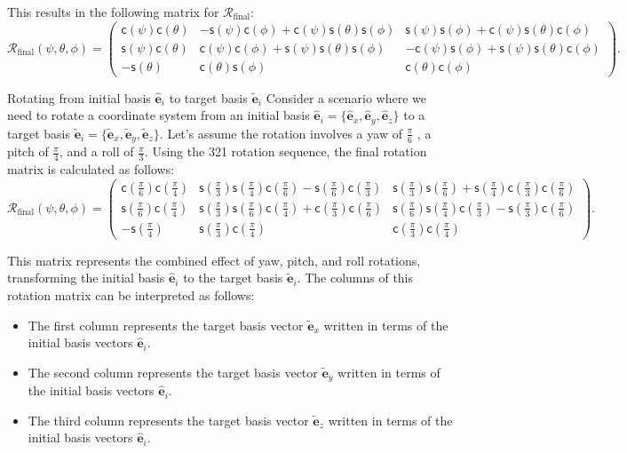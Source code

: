 \documentclass{article}
\def\eh{\hat{\mathbf{e}}}
\def\et{\tilde{\mathbf{e}}}
\def\R{\mathcal{R}}
\def\c{\textsf{c}}
\def\s{\textsf{s}}
\begin{document}
\noindent This results in the following matrix for \(\R_{\text{final}}\):
\[
  \R_{\text{final}} (\psi, \theta, \phi) = 
\begin{pmatrix}
\c(\psi)\c(\theta) & -\s(\psi)\c(\phi) + \c(\psi)\s(\theta)\s(\phi) & \s(\psi)\s(\phi) + \c(\psi)\s(\theta)\c(\phi) \\
\s(\psi)\c(\theta) & \c(\psi)\c(\phi) + \s(\psi)\s(\theta)\s(\phi) & -\c(\psi)\s(\phi) + \s(\psi)\s(\theta)\c(\phi) \\
-\s(\theta) & \c(\theta)\s(\phi) & \c(\theta)\c(\phi)
\end{pmatrix}.
\]

\begin{egsBox}[label={egs:rot3Dex1}, float, floatplacement=t]{Rotating from initial basis $\eh_i$ to target basis $\et_i$}
  \footnotesize
  Consider a scenario where we need to rotate a coordinate system from an initial basis $\eh_i = \{\eh_x, \eh_y, \eh_z\}$ to a target basis $\et_i = \{\et_x, \et_y, \et_z\}$. Let's assume the rotation involves a yaw of $\frac{\pi}{6}$ , a pitch of $\frac{\pi}{4}$, and a roll of $\frac{\pi}{3}$. Using the 321 rotation sequence, the final rotation matrix is calculated as follows:
 \[
  \R_{\text{final}} (\psi, \theta, \phi) = \begin{pmatrix}
\c(\frac{\pi}{6}) \c(\frac{\pi}{4}) & \s(\frac{\pi}{3}) \s(\frac{\pi}{4}) \c(\frac{\pi}{6}) - \s(\frac{\pi}{6}) \c(\frac{\pi}{3}) & \s(\frac{\pi}{3}) \s(\frac{\pi}{6}) + \s(\frac{\pi}{4}) \c(\frac{\pi}{3}) \c(\frac{\pi}{6}) \\
\s(\frac{\pi}{6}) \c(\frac{\pi}{4}) & \s(\frac{\pi}{3}) \s(\frac{\pi}{6}) \c(\frac{\pi}{4}) + \c(\frac{\pi}{3}) \c(\frac{\pi}{6}) & \s(\frac{\pi}{6}) \s(\frac{\pi}{4}) \c(\frac{\pi}{3}) - \s(\frac{\pi}{3}) \c(\frac{\pi}{6}) \\
-\s(\frac{\pi}{4}) & \s(\frac{\pi}{3}) \c(\frac{\pi}{4}) & \c(\frac{\pi}{3}) \c(\frac{\pi}{4})
\end{pmatrix}.
\]

 This matrix represents the combined effect of yaw, pitch, and roll rotations, transforming the initial basis $\eh_i$ to the target basis $\et_i$. The columns of this rotation matrix can be interpreted as follows:
  \begin{itemize}
    \item The first column represents the target basis vector $\et_x$ written in terms of the initial basis vectors $\eh_i$.
    \item The second column represents the target basis vector $\et_y$ written in terms of the initial basis vectors $\eh_i$.
    \item The third column represents the target basis vector $\et_z$ written in terms of the initial basis vectors $\eh_i$.
  \end{itemize}
\end{egsBox}
\end{document}

